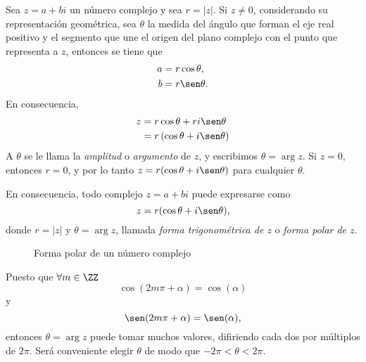Sea $z = a + bi$ un número complejo y sea $r = |z|$. Si $z \neq 0$, considerando su representación geométrica, sea $\theta$ la medida del ángulo que forman el eje real positivo y el segmento que une el origen del plano complejo con el punto que representa a $z$, entonces se tiene que
\begin{align*}
    a & = r \cos \theta , \\ 
    b & = r \sen \theta .
\end{align*}
En consecuencia,
\begin{align*}
    z & = r \cos \theta + r i \sen \theta \\ 
    & = r \left( \cos \theta + i \sen \theta \right)
\end{align*}
A $\theta$ se le llama la \emph{amplitud} o \emph{argumento} de $z$, y escribimos $\theta = \arg z$. Si $z = 0$, entonces $r = 0$, y por lo tanto $z = r(\cos \theta + i\sen \theta)$ para cualquier $\theta$.

En consecuencia, todo complejo $z = a + bi$ puede expresarse como
$$z = r(\cos \theta + i\sen \theta),$$
donde $r = |z|$ y $\theta = \arg z$, llamada \emph{forma trigonométrica de $z$} o \emph{forma polar de $z$}.
\begin{figure}[h!]
    \centering
    \caption{Forma polar de un número complejo}
\end{figure}

Puesto que $\forall m \in \ZZ$
$$\cos(2m\pi + \alpha ) = \cos(\alpha)$$
y
$$\sen(2m\pi + \alpha) = \sen(\alpha),$$
entonces $\theta = \arg z$ puede tomar muchos valores, difiriendo cada dos por múltiplos de $2\pi$. Será conveniente elegir $\theta$ de modo que $-2\pi < \theta < 2\pi$.


